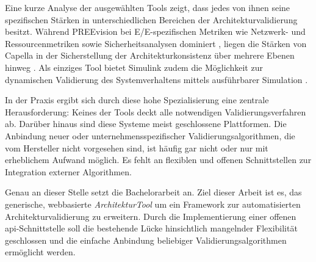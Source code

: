 Eine kurze Analyse der ausgewählten Tools zeigt, dass jedes von ihnen seine spezifischen Stärken in unterschiedlichen Bereichen der Architekturvalidierung besitzt. Während PREEvision bei E/E-spezifischen Metriken wie Netzwerk- und Ressourcenmetriken sowie Sicherheitsanalysen dominiert \cite{schauffele2016architectural}, liegen die Stärken von Capella in der Sicherstellung der Architekturkonsistenz über mehrere Ebenen hinweg \cite{roques2016mbse}. Als einziges Tool bietet Simulink zudem die Möglichkeit zur dynamischen Validierung des Systemverhaltens mittels ausführbarer Simulation \cite{themathworksinc.2025system}.

In der Praxis ergibt sich durch diese hohe Spezialisierung eine zentrale Herausforderung: Keines der Tools deckt alle notwendigen Validierungsverfahren ab. Darüber hinaus sind diese Systeme meist geschlossene Plattformen. Die Anbindung neuer oder unternehmensspezifischer Validierungsalgorithmen, die vom Hersteller nicht vorgesehen sind, ist häufig gar nicht oder nur mit erheblichem Aufwand möglich. Es fehlt an flexiblen und offenen Schnittstellen zur Integration externer Algorithmen.

\break
Genau an dieser Stelle setzt die Bachelorarbeit an. Ziel dieser Arbeit ist es, das generische, webbasierte \textit{ArchitekturTool} um ein Framework zur automatisierten Architekturvalidierung zu erweitern. Durch die Implementierung einer offenen \gls{api}-Schnittstelle soll die bestehende Lücke hinsichtlich mangelnder Flexibilität geschlossen und die einfache Anbindung beliebiger Validierungsalgorithmen ermöglicht werden.
